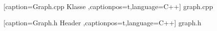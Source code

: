 \documentclass[10pt,a4paper]{article}
\author{Janos und Felix}
\begin{document}
 
    [caption={Graph.cpp Klasse}
       ,captionpos=t,language=C++]
 {graph.cpp}
  
    [caption={Graph.h Header}
       ,captionpos=t,language=C++]
 {graph.h}
\end{document}
